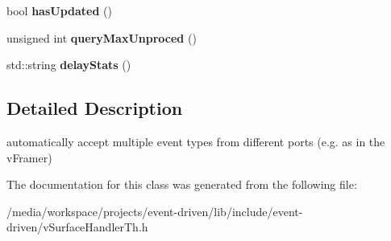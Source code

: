 \begin{DoxyCompactItemize}
\mbox{\label{classev_1_1syncvstreams_adff155da0d9cf739725127c446b1e575}} 
bool {\bfseries has\+Updated} ()
\item 
\mbox{\label{classev_1_1syncvstreams_a481bbbc4b4a0b4d7721e630da92de71c}} 
unsigned int {\bfseries query\+Max\+Unproced} ()
\item 
\mbox{\label{classev_1_1syncvstreams_a40bb750373f2b6d406e57bbd70bc40b1}} 
std\+::string {\bfseries delay\+Stats} ()
\end{DoxyCompactItemize}


\subsection{Detailed Description}
automatically accept multiple event types from different ports (e.\+g. as in the v\+Framer) 

The documentation for this class was generated from the following file\+:\begin{DoxyCompactItemize}
\item 
/media/workspace/projects/event-\/driven/lib/include/event-\/driven/v\+Surface\+Handler\+Th.\+h\end{DoxyCompactItemize}
